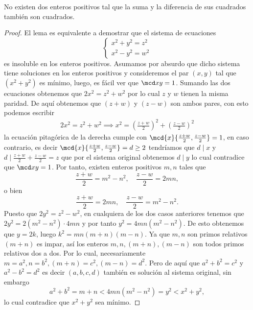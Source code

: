 \begin{lemma}
    No existen dos enteros positivos tal que la suma y la diferencia de sus cuadrados también son cuadrados.
\end{lemma}
\begin{proof}
    El lema es equivalente a demostrar que el sistema de ecuaciones
    \[
        \begin{cases}
            x^2 + y^2 = z^2\\
            x^2 - y^2 = w^2
        \end{cases}
    \]
    es insoluble en los enteros positivos.
    Asumamos por absurdo que dicho sistema tiene soluciones en los enteros positivos y consideremos el par $(x,y)$ tal que
    $(x^2 + y^2)$ es mínimo, luego, es fácil ver que $\mcd x y = 1$.
    Sumando las dos ecuaciones obtenemos que $2x^2 = z^2 + w^2$ por lo cual $z$ y $w$ tienen la misma paridad.
    De aquí obtenemos que $(z + w)$ y $(z - w)$ son ambos pares, con esto podemos escribir
    \begin{align*}
        2x^2 = z^2 + w^2 \implies x^2 = \left(\frac{z + w}{2}\right)^2 + \left(\frac{z - w}{2}\right)^2
    \end{align*}
    la ecuación pitagórica de la derecha cumple con $\mcd{x}{\frac{z + w}{2}, \frac{z - w}{2}} = 1$, en caso contrario, es decir
    $\mcd{x}{\frac{z + w}{2}, \frac{z - w}{2}} = d \geq 2$ tendríamos que $d \mid x$ y $d \mid \frac{z + w}{2} + \frac{z - w}{2} = z$
    que por el sistema original obtenemos $d \mid y$ lo cual contradice que $\mcd x y = 1$.
    Por tanto, existen enteros positivos $m,n$ tales que
    \[
        \frac{z + w}{2} = m^2 - n^2, \quad \frac{z - w}{2} = 2mn,
    \]
    o bien
    \[
        \frac{z + w}{2} = 2mn, \quad \frac{z - w}{2} = m^2 - n^2.
    \]
    Puesto que $2y^2 = z^2 - w^2$, en cualquiera de los dos casos anteriores tenemos que $2y^2 = 2(m^2 - n^2)\cdot 4mn$ y por tanto
    $y^2 = 4mn(m^2 - n^2)$.
    De esto obtenemos que $y = 2k$, luego $k^2 = mn(m + n)(m - n)$.
    Ya que $m,n$ son primos relativos $(m + n)$ es impar, así los enteros $m, n, (m + n), (m - n)$ son todos primos relativos dos a dos.
    Por lo cual, necesariamente $m = a^2, n = b^2, (m + n) = c^2, (m - n) = d^2$.
    Pero de aquí que $a^2 + b^2 = c^2$ y $a^2 - b^2 = d^2$ es decir $(a,b,c,d)$ también es solución al sistema original, sin embargo
    \[
        a^2 + b^2 = m + n < 4mn(m^2 - n^2) = y^2 < x^2 + y^2,
    \]
    lo cual contradice que $x^2 + y^2$ sea mínimo.
\end{proof}

